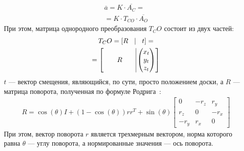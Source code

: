 \documentclass[12pt, a4paper]{article}
\begin{document}
\begin{equation}
\begin{gathered}
    \overline{a} = K \cdot \overline{A_C} = \\
    = K \cdot T_{CO} \cdot \overline{A_O}
\end{gathered}
\label{eqn:full_projection}
\end{equation}
При этом, матрица однородного преобразования $T_CO$ состоит из двух частей:
\begin{equation}
\begin{gathered}
    T_CO = \left[ R \quad \vline \quad t \right] = \\
    = \left[
        \qquad R \qquad \vline \begin{pmatrix}
        x_t\\
        y_t\\
        z_t
    \end{pmatrix}
    \right]
\end{gathered}
\label{eqn:projection_matrix_tf}
\end{equation}
$t$ --- вектор смещения, являющийся, по сути, просто положением доски, а $R$ ---
матрица поворота, полученная по формуле Родрига~\cite{opencv_rodrigues}:
\begin{equation}
\begin{gathered}
    R = \cos(\theta) I + (1 - \cos(\theta))r r^T + \sin(\theta) \begin{bmatrix}
         0   & -r_z & r_y\\
        r_z  & 0    & -r_x\\
        -r_y & r_x  & 0
    \end{bmatrix}
\end{gathered}
\label{eqn:rodrigues_formula}
\end{equation}
При этом, вектор поворота $r$ является трехмерным вектором, норма которого равна
$\theta$ --- углу поворота, а нормированные значения --- ось поворота.
\end{document}
